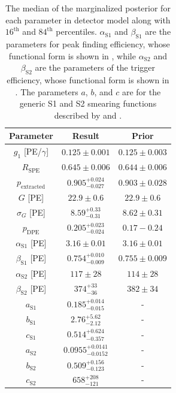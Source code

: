 \begin{table}[t]
\centering
\def\arraystretch{1.3}
\begin{tabular}{c|cc}
Parameter & Result & Prior \\
\hline
$g_1$ [PE/$\gamma$] & $0.125 \pm 0.001$ & $0.125 \pm 0.003$  \\
$R_{\textrm{SPE}}$ & $0.645 \pm 0.006$ & $0.644 \pm 0.006$ \\
$p_{\textrm{extracted}}$ & $0.905^{+0.024}_{-0.027}$ & $0.903 \pm 0.028$ \\
$G$ [PE] & $22.9 \pm 0.6$ & $22.9 \pm 0.6$  \\
$\sigma_G$ [PE] & $8.59^{+0.33}_{-0.31}$ & $8.62 \pm 0.31$  \\
$p_{\textrm{DPE}}$ & $0.205^{+0.023}_{-0.024}$ & $0.17 - 0.24$ \\

$\alpha_{\textrm{S1}}$ [PE] & $3.16 \pm 0.01$ & $3.16 \pm 0.01$ \\
$\beta_{\textrm{S1}}$ [PE] & $0.754^{+0.010}_{-0.009}$ & $0.755 \pm 0.009$ \\

$\alpha_{\textrm{S2}}$ [PE] & $117 \pm 28$ & $114 \pm 28$ \\
$\beta_{\textrm{S2}}$ [PE] & $374^{+33}_{-36}$ & $382 \pm 34$ \\

$a_{\textrm{S1}}$ & $0.185^{+0.014}_{-0.015}$ & - \\
$b_{\textrm{S1}}$ & $2.76^{+5.62}_{-2.12}$ & - \\
$c_{\textrm{S1}}$ & $0.514^{+0.624}_{-0.357}$ & - \\

$a_{\textrm{S2}}$ & $0.0955^{+0.0141}_{-0.0152}$ & - \\
$b_{\textrm{S2}}$ & $0.509^{+0.156}_{-0.123}$ & - \\
$c_{\textrm{S2}}$ & $658^{+208}_{-121}$ & - \\

\end{tabular}
\caption{The median of the marginalized posterior for each parameter in detector model along with $16^{\textrm{th}}$ and $84^{\textrm{th}}$ percentiles.  $\alpha_{\textrm{S1}}$ and $\beta_{\textrm{S1}}$ are the parameters for peak finding efficiency, whose functional form is shown in , while $\alpha_{\textrm{S2}}$ and $\beta_{\textrm{S2}}$ are the parameters of the trigger efficiency, whose functional form is shown in .  The parameters $a$, $b$, and $c$ are for the generic S1 and S2 smearing functions described by  and .}
\label{tab:nerix_detector_model}
\end{table}



